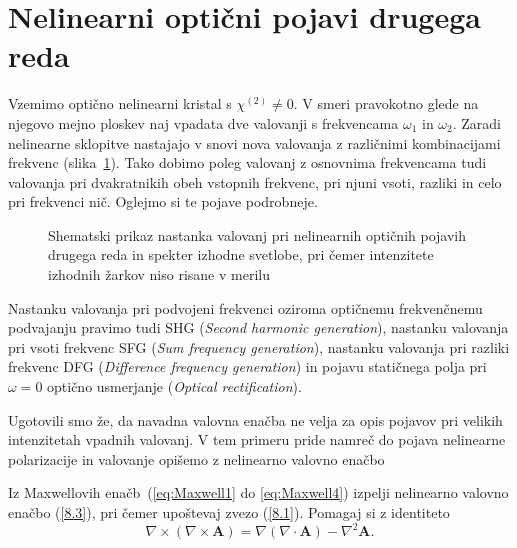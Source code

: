 \section{Nelinearni optični pojavi drugega reda}
Vzemimo optično nelinearni kristal s $\chi^{(2)} \neq 0$. V smeri pravokotno 
glede na njegovo mejno ploskev naj vpadata dve valovanji s frekvencama
$\omega_{1}$ in $\omega_{2}$. Zaradi nelinearne sklopitve nastajajo v snovi nova 
valovanja z različnimi kombinacijami frekvenc (slika~\ref{fig:nl2}).
Tako dobimo poleg valovanj z osnovnima frekvencama tudi valovanja pri dvakratnikih
obeh vstopnih frekvenc, pri njuni vsoti, 
razliki in celo pri frekvenci nič. Oglejmo si te pojave podrobneje.
\\ 

\begin{figure}[h]
\centering
\def\svgwidth{140truemm} 

\caption{Shematski prikaz nastanka valovanj pri nelinearnih optičnih pojavih drugega reda 
in spekter izhodne svetlobe, pri čemer intenzitete izhodnih žarkov niso risane v merilu}
\label{fig:nl2}
\end{figure}

\begin{remark}
Nastanku valovanja pri podvojeni frekvenci oziroma optičnemu frekvenčnemu podvajanju pravimo tudi
SHG ({\it Second harmonic 
generation}), 
nastanku valovanja pri vsoti frekvenc SFG
({\it Sum frequency generation}), 
nastanku valovanja pri razliki frekvenc DFG 
({\it Difference frequency generation}) in pojavu 
statičnega polja pri $\omega = 0$ optično usmerjanje
({\it Optical rectification}).  
\end{remark}

Ugotovili smo že, da navadna valovna enačba ne velja za opis pojavov pri velikih 
intenzitetah vpadnih valovanj. V tem primeru pride namreč  do pojava
nelinearne polarizacije in valovanje opišemo z nelinearno valovno enačbo

\begin{definition}
Iz Maxwellovih enačb~(\ref{eq:Maxwell1} do \ref{eq:Maxwell4}) izpelji 
nelinearno valovno enačbo (\ref{8.3}), pri čemer upoštevaj zvezo (\ref{8.1}). 
Pomagaj si z identiteto
$$
\nabla \times (\nabla \times \mathbf{A}) = \nabla (\nabla \cdot \mathbf{A}) 
- \nabla^2 \mathbf{A}.
$$
\end{definition} 

